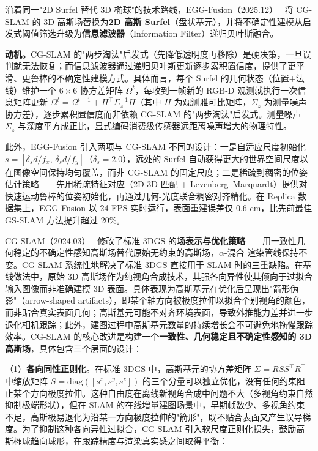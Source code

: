 沿着同一"2D Surfel 替代 3D 椭球"的技术路线，EGG-Fusion（2025.12）~\cite{2512_01296} 将 CG-SLAM 的 3D 高斯场替换为\textbf{2D 高斯 Surfel}（盘状基元），并将不确定性建模从启发式阈值筛选升级为\textbf{信息滤波器}（Information Filter）递归贝叶斯融合。

\textbf{动机。}CG-SLAM 的"两步淘汰"启发式（先降低透明度再移除）是硬决策，一旦误判就无法恢复；而信息滤波器通过递归贝叶斯更新逐步累积置信度，提供了更平滑、更鲁棒的不确定性建模方式。具体而言，每个 Surfel 的几何状态（位置+法线）维护一个 $6\times6$ 协方差矩阵 $\Omega^t$，每收到一帧新的 RGB-D 观测就执行一次信息矩阵更新 $\Omega^t = \Omega^{t-1} + H^\top \Sigma_z^{-1} H$（其中 $H$ 为观测雅可比矩阵，$\Sigma_z$ 为测量噪声协方差），逐步累积置信度而非依赖 CG-SLAM 的"两步淘汰"启发式。测量噪声 $\Sigma_z$ 与深度平方成正比，显式编码消费级传感器远距离噪声增大的物理特性。

此外，EGG-Fusion 引入两项与 CG-SLAM 不同的设计：一是自适应尺度初始化 $s = [\delta_s d/f_x,\, \delta_s d/f_y]$（$\delta_s=2.0$），远处的 Surfel 自动获得更大的世界空间尺度以在图像空间保持均匀覆盖，而非 CG-SLAM 的固定尺度；二是稀疏到稠密的位姿估计策略——先用稀疏特征对应（2D-3D 匹配 + Levenberg--Marquardt）提供对快速运动鲁棒的位姿初始化，再通过几何-光度联合稠密对齐精化。在 Replica 数据集上，EGG-Fusion 以 24 FPS 实时运行，表面重建误差仅 0.6 cm，比先前最佳 GS-SLAM 方法提升超过 20\%。

CG-SLAM（2024.03）~\cite{2403_16095} 修改了标准 3DGS 的\textbf{场表示与优化策略}——用一致性几何稳定的不确定性感知高斯场替代原始无约束的高斯场，$\alpha$-混合 渲染管线保持不变。CG-SLAM 系统性地解决了标准 3DGS 直接用于 SLAM 时的三重缺陷。在基线做法中，原始 3D 高斯场作为纯视角合成技术，其强各向异性使其倾向于过拟合输入图像而非准确建模 3D 表面。具体表现为高斯基元在优化后呈现出"箭形伪影"（arrow-shaped artifacts），即某个轴方向被极度拉伸以拟合个别视角的颜色，而非贴合真实表面几何；高斯基元可能不对齐环境表面，导致外推能力差并进一步退化相机跟踪；此外，建图过程中高斯基元数量的持续增长会不可避免地拖慢跟踪效率。CG-SLAM 的核心改进是构建一个\textbf{一致性、几何稳定且不确定性感知的 3D 高斯场}，具体包含三个层面的设计：

（1）\textbf{各向同性正则化}。在标准 3DGS 中，高斯基元的协方差矩阵 $\Sigma = RSS^\top R^\top$ 中缩放矩阵 $S = \text{diag}([s^x, s^y, s^z])$ 的三个分量可以独立优化，没有任何约束阻止某个方向极度拉伸。这种自由度在离线新视角合成中问题不大（多视角约束自然抑制极端形状），但在 SLAM 的在线增量建图场景中，早期帧数少、多视角约束不足，高斯极易退化为沿某一方向极度拉伸的"箭形"，既不贴合表面又产生误导梯度。为了抑制这种各向异性过拟合，CG-SLAM 引入软尺度正则化损失，鼓励高斯椭球趋向球形，在跟踪精度与渲染真实感之间取得平衡：

